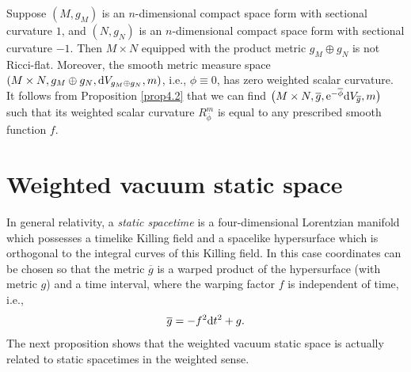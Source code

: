 \documentclass[10pt,a4paper]{amsart}
\numberwithin{equation}{section}
\begin{document}
Suppose $(M,g_M)$ is an $n$-dimensional compact space form with sectional curvature $1$,
and $(N,g_N)$ is an $n$-dimensional compact space form with sectional curvature $-1$.
Then $M\times N$ equipped with the product metric $g_M\oplus g_N$
is not Ricci-flat. Moreover,
the smooth metric measure space $(M\times N,g_M\oplus g_N,{\rm d}V_{g_M\oplus g_N},m)$, i.e., $\phi\equiv 0$,
has zero weighted scalar curvature. It follows from Proposition \ref{prop4.2} that
we can find
$\bigl(M\times N,\overline{g},{\rm e}^{-\overline{\phi}}{\rm d}V_{\overline{g}},m\bigr)$ such that
its weighted scalar curvature $R_{\overline{\phi}}^m$ is equal to any prescribed smooth function $f$.

\section{Weighted vacuum static space} \label{sec4}

In general relativity, a \textit{static spacetime} is a four-dimensional Lorentzian manifold which possesses a timelike Killing field and a spacelike hypersurface which is orthogonal to the integral curves of this Killing field. In this case coordinates can be chosen so that the metric $\overline{g}$ is a warped product of the hypersurface (with metric $g$) and a time interval, where the warping factor $f$ is independent of time, i.e.,
\begin{equation*}
 \overline{g}=-f^2{\rm d}t^2+g.
\end{equation*}
The next proposition shows that the weighted vacuum static space is actually related to static spacetimes in the weighted sense.
\end{document}

